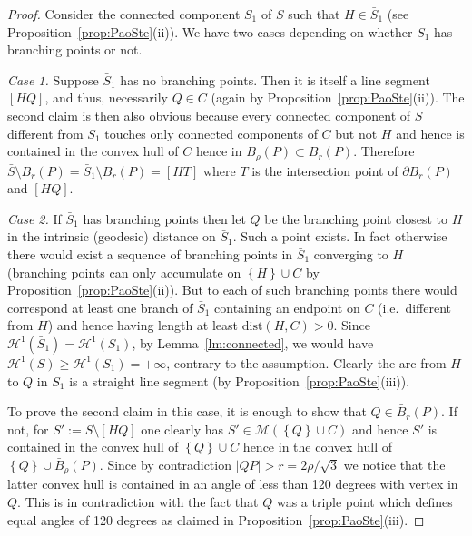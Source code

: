\documentclass{amsart}
\renewcommand{\H}{\mathcal H}
\newcommand{\abs}[1]{\left\vert #1 \right\vert}
\newcommand{\ENCLOSE}[1]{\left\{#1\right\}}
\newcommand{\M}{\mathcal{M}}
\renewcommand{\H}{\mathcal{H}}
\newcommand{\dist}{\mathrm{dist}}
\theoremstyle{definition}
\theoremstyle{remark}
\begin{document}
\begin{proof}
  Consider the connected component $S_1$ of $S$ such that $H\in \bar S_1$
  (see Proposition~\ref{prop:PaoSte}(ii)).
  We have two cases depending on whether $S_1$ has branching points or not.
  
  \emph{Case 1.} Suppose $\bar S_1$ has no branching points. 
  Then it is itself a line 
  segment $[HQ]$, and thus, necessarily $Q\in C$ 
  (again by Proposition~\ref{prop:PaoSte}(ii)).
  The second claim is then also obvious because every connected component 
  of $S$ different from $S_1$ touches only connected components of $C$ 
  but not $H$
  and hence is contained in the convex hull of $C$ hence in $B_\rho(P)\subset B_r(P)$.
  Therefore $\bar S\setminus B_r(P) = \bar S_1\setminus B_r(P) = [HT]$
  where $T$ is the intersection point of $\partial B_r(P)$ and $[HQ]$.
  
  \emph{Case 2.} If $\bar S_1$ has branching points
  then let $Q$ be the branching point closest to $H$ 
  in the intrinsic (geodesic) distance on $\bar S_1$.
  Such a point exists. In fact otherwise there would exist a sequence of 
  branching points in $\bar S_1$ converging to $H$
  (branching points can only accumulate on $\ENCLOSE{H}\cup C$ 
  by Proposition~\ref{prop:PaoSte}(ii)).
  But to each of such branching points there would correspond at least 
  one branch of $\bar S_1$ containing an endpoint on $C$ 
  (i.e.\ different from $H$) and hence having length at least $\dist(H,C)>0$.
  Since $\H^1(\bar S_1)=\H^1(S_1)$, by Lemma~\ref{lm:connected}, 
  we would have $\H^1(S)\ge \H^1(S_1)= +\infty$, contrary to the assumption.
  Clearly the arc from $H$ to $Q$ in $\bar S_1$ is a straight line segment 
  (by Proposition~\ref{prop:PaoSte}(iii)).
  
  To prove the second claim in this case, 
  it is enough to show that $Q\in \bar B_r(P)$.
  If not, for $S':=S\setminus [HQ]$ one clearly has $S'\in \M(\ENCLOSE{Q} \cup C)$
  and hence $S'$ is contained in the convex hull of $\ENCLOSE{Q}\cup C$
  hence in the convex hull of $\ENCLOSE{Q}\cup \bar B_\rho(P)$.
  Since by contradiction $\abs{QP}> r = 2\rho/\sqrt 3$ 
  we notice that the latter convex 
  hull is contained in an angle of less than 120 degrees with vertex in $Q$.
  This is in contradiction with the fact that $Q$ was a triple point 
  which defines equal angles of 120 degrees as claimed in 
  Proposition~\ref{prop:PaoSte}(iii).
  \end{proof}
\end{document}
